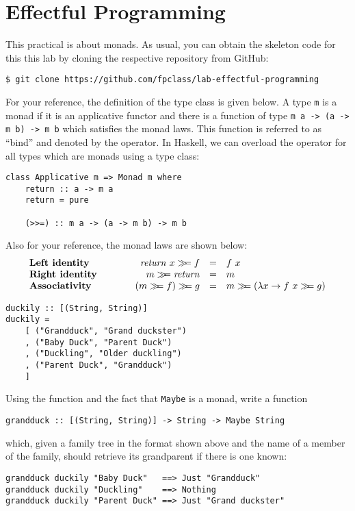 \section{Effectful Programming}

This practical is about monads. As usual, you can obtain the skeleton code for this this lab by cloning the respective repository from GitHub:
\begin{verbatim}
$ git clone https://github.com/fpclass/lab-effectful-programming
\end{verbatim}
For your reference, the definition of the  type class is given below. A type \texttt{\small m} is a monad if it is an applicative functor and there is a function of type \texttt{\small m~a -> (a -> m~b) -> m~b} which satisfies the monad laws. This function is referred to as ``bind'' and denoted by the  \haskellIn{(>>=)} operator. In Haskell, we can overload the \haskellIn{(>>=)} operator for all types which are monads using a type class:
\begin{verbatim}
class Applicative m => Monad m where 
    return :: a -> m a 
    return = pure 
    
    (>>=) :: m a -> (a -> m b) -> m b
\end{verbatim}
Also for your reference, the monad laws are shown below:
\begin{displaymath}
\begin{array}{lcrcl}
\textbf{Left identity} &\qquad & \mathit{return}~x \bind f & = & f~x \\
\textbf{Right identity} &\qquad & m \bind \mathit{return} & = & m \\
\textbf{Associativity} & \qquad & (m \bind f) \bind g & = & m \bind (\lambda x \to f~x \bind g)
\end{array}
\end{displaymath}

\taskLine 

\begin{verbatim}
duckily :: [(String, String)]
duckily =
    [ ("Grandduck", "Grand duckster")
    , ("Baby Duck", "Parent Duck")
    , ("Duckling", "Older duckling")
    , ("Parent Duck", "Grandduck")
    ]
\end{verbatim}
Using the  function and the fact that \texttt{\small Maybe} is a monad, write a function 
\begin{verbatim}
grandduck :: [(String, String)] -> String -> Maybe String
\end{verbatim}
which, given a family tree in the format shown above and the name of a member of the family, should retrieve its grandparent if there is one known:
\begin{verbatim}
grandduck duckily "Baby Duck"   ==> Just "Grandduck"
grandduck duckily "Duckling"    ==> Nothing
grandduck duckily "Parent Duck" ==> Just "Grand duckster"
\end{verbatim}

